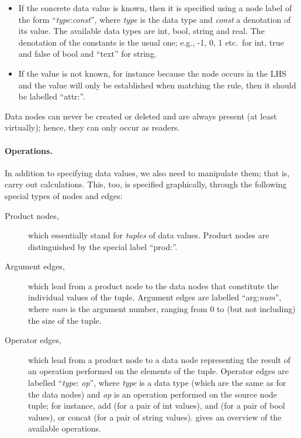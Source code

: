 \begin{itemize}
\item If the concrete data value is known, then it is specified using a node
  label of the form ``\textsf{{\itshape type}:{\itshape const}}'', where
  \textsf{\itshape type} is the data type and \textsf{\itshape const} a
  denotation of its value. The available data types are \textsf{int},
  \textsf{bool}, \textsf{string} and \textsf{real}. The denotation of the
  constants is the usual one; e.g., \textsf{-1}, \textsf{0}, \textsf{1} etc.\
  for \textsf{int}, \textsf{true} and \textsf{false} of \textsf{bool} and
  \textsf{``text''} for \textsf{string}.

\item If the value is not known, for instance because the node occurs in the
  LHS and the value will only be established when matching the rule, then it
  should be labelled ``\textsf{attr:}''.
\end{itemize}
%
Data nodes can never be created or deleted and are always present (at least
virtually); hence, they can only occur as readers.

\paragraph{Operations.}

In addition to specifying data values, we also need to manipulate them; that
is, carry out calculations. This, too, is specified graphically, through
the following special types of nodes and edges:
%
\begin{description}
\item[Product nodes,] which essentially stand for \emph{tuples} of data
  values. Product nodes are distinguished by the special label
  ``\textsf{prod:}''.

\item[Argument edges,] which lead from a product node to the data nodes that
  constitute the individual values of the tuple. Argument edges are labelled
  ``\textsf{arg:{\itshape num}}'', where \textsf{\itshape num} is the argument
  number, ranging from \textsf{0} to (but not including) the size of the tuple.

\item[Operator edges,] which lead from a product node to a data node
  representing the result of an operation performed on the elements of the
  tuple. Operator edges are labelled ``\textsf{{\itshape type}:{\itshape
  op}}'', where \textsf{\itshape type} is a data type (which are the same as
  for the data nodes) and \textsf{\itshape op} is an operation performed on the
  source node tuple; for instance, \textsf{add} (for a pair of \textsf{int}
  values), \textsf{and} (for a pair of \textsf{bool} values), or
  \textsf{concat} (for a pair of \textsf{string} values).  gives an
  overview of the available operations.
\end{description}

